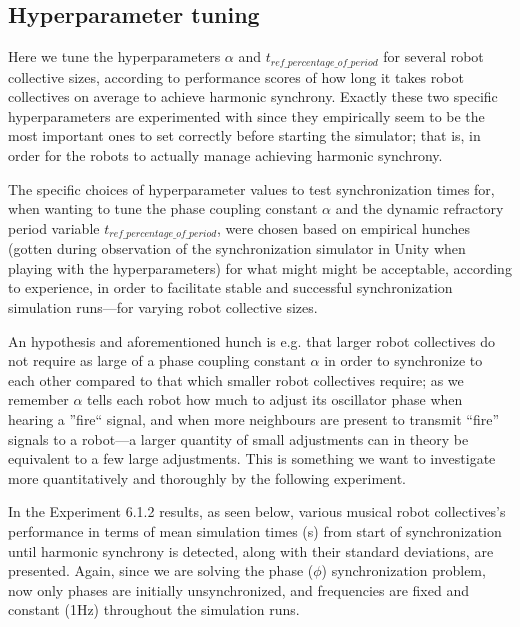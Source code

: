 	
	\subsection{Hyperparameter tuning}
	
	Here we tune the hyperparameters $\alpha$ and $t_{ref\_percentage\_of\_period}$ for several robot collective sizes, according to performance scores of how long it takes robot collectives on average to achieve harmonic synchrony. Exactly these two specific hyperparameters are experimented with since they empirically seem to be the most important ones to set correctly before starting the simulator; that is, in order for the robots to actually manage achieving harmonic synchrony.
	
	The specific choices of hyperparameter values to test synchronization times for, when wanting to tune the phase coupling constant $\alpha$ and the dynamic refractory period variable $t_{ref\_percentage\_of\_period}$, were chosen based on empirical hunches (gotten during observation of the synchronization simulator in Unity when playing with the hyperparameters) for what might might be acceptable, according to experience, in order to facilitate stable and successful synchronization simulation runs—for varying robot collective sizes. 
	
	An hypothesis and aforementioned hunch is e.g. that larger robot collectives do not require as large of a phase coupling constant $\alpha$ in order to synchronize to each other compared to that which smaller robot collectives require; as we remember $\alpha$ tells each robot how much to adjust its oscillator phase when hearing a ''fire`` signal, and when more neighbours are present to transmit ``fire'' signals to a robot—a larger quantity of small adjustments can in theory be equivalent to a few large adjustments. This is something we want to investigate more quantitatively and thoroughly by the following experiment.
	
	In the Experiment 6.1.2 results, as seen below, various musical robot collectives's performance in terms of mean simulation times (s) from start of synchronization until harmonic synchrony is detected, along with their standard deviations, are presented. Again, since we are solving the phase ($\phi$) synchronization problem, now only phases are initially unsynchronized, and frequencies are fixed and constant (1Hz) throughout the simulation runs.
	
	
	
